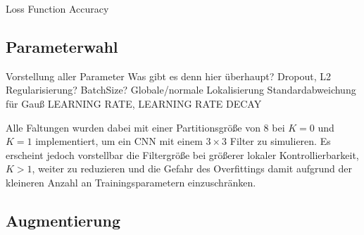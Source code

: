Loss Function
Accuracy

\subsection{Parameterwahl}
\label{parameterwahl}

Vorstellung aller Parameter
Was gibt es denn hier überhaupt?
Dropout, L2 Regularisierung?
BatchSize?
Globale/normale Lokalisierung
Standardabweichung für Gauß
LEARNING RATE, LEARNING RATE DECAY

Alle Faltungen wurden dabei mit einer Partitionsgröße von $8$ bei $K=0$ und $K=1$ implementiert, um ein \gls{CNN} mit einem $3 \times 3$ Filter zu simulieren.
Es erscheint jedoch vorstellbar die Filtergröße bei größerer lokaler Kontrollierbarkeit, \dhe{} $K > 1$, weiter zu reduzieren und die Gefahr des Overfittings damit aufgrund der kleineren Anzahl an Trainingsparametern einzuschränken.

\subsection{Augmentierung}
\label{augmentierung}


